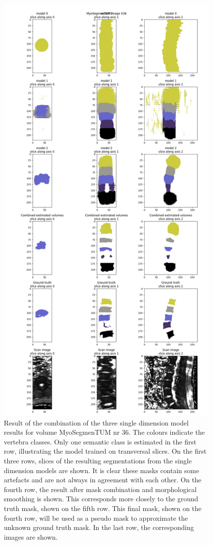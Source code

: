 \begin{figure}
    \centering
    \includegraphics[width=.95\textwidth]{images/comb1_denoise2_erode1_MyoSegmenTUM_036.png}
    \caption{
        Result of the combination of the three single dimension model results for volume MyoSegmenTUM nr 36.
        The colours indicate the vertebra classes. Only one semantic class is estimated in the first row, illustrating the model trained on transversal slices.
        On the first three rows, slices of the resulting segmentations from the single dimension models are shown. 
        It is clear these masks contain some artefacts and are not always in agreement with each other.
        On the fourth row, the result after mask combination and morphological smoothing is shown. 
        This corresponds more closely to the ground truth mask, shown on the fifth row.
        This final mask, shown on the fourth row, will be used as a pseudo mask to approximate the unknown ground truth mask.
        In the last row, the corresponding images are shown. \label{fig:comb1_1}
    }
\end{figure}

